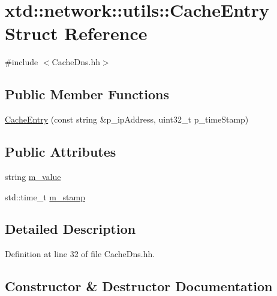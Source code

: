 \hypertarget{structxtd_1_1network_1_1utils_1_1CacheEntry}{}\section{xtd\+:\+:network\+:\+:utils\+:\+:Cache\+Entry Struct Reference}
\label{structxtd_1_1network_1_1utils_1_1CacheEntry}


{\ttfamily \#include $<$Cache\+Dns.\+hh$>$}

\subsection*{Public Member Functions}
\begin{DoxyCompactItemize}
\item 
\hyperlink{structxtd_1_1network_1_1utils_1_1CacheEntry_acaf6749bc9eb587ffe1181dd4d7306b5}{Cache\+Entry} (const string \&p\+\_\+ip\+Address, uint32\+\_\+t p\+\_\+time\+Stamp)
\end{DoxyCompactItemize}
\subsection*{Public Attributes}
\begin{DoxyCompactItemize}
\item 
string \hyperlink{structxtd_1_1network_1_1utils_1_1CacheEntry_abbe786f1da8194495f1e36d8de8ba0b3}{m\+\_\+value}
\item 
std\+::time\+\_\+t \hyperlink{structxtd_1_1network_1_1utils_1_1CacheEntry_a277e95a1f5e0485e98568b7a583b0184}{m\+\_\+stamp}
\end{DoxyCompactItemize}


\subsection{Detailed Description}


Definition at line 32 of file Cache\+Dns.\+hh.



\subsection{Constructor \& Destructor Documentation}
